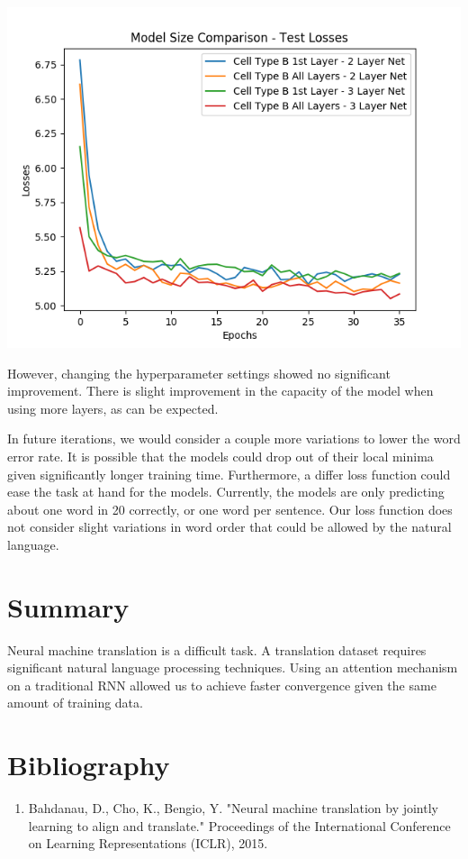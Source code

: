 \documentclass[letterpaper, 10pt]{article}
\begin{document}
\begin{multicols}{2}
\begin{center}
\includegraphics[scale=.4]{size_comparison_losses_test}
\end{center}

\noindent However, changing the hyperparameter settings showed no significant improvement.
There is slight improvement in the capacity of the model when using more layers, as can be expected.

In future iterations, we would consider a couple more variations to lower the word error rate.
It is possible that the models could drop out of their local minima given significantly longer
training time.
Furthermore, a differ loss function could ease the task at hand for the models.
Currently, the models are only predicting about one word in 20 correctly, or one word per sentence.
Our loss function does not consider slight variations in word order that could be allowed by the
natural language.

\section{Summary}
Neural machine translation is a difficult task.
A translation dataset requires significant natural language processing techniques.
Using an attention mechanism on a traditional RNN allowed us to achieve faster convergence given
the same amount of training data.

\section{Bibliography}
\begin{enumerate}
\item Bahdanau, D., Cho, K., Bengio, Y. "Neural machine translation by jointly learning to align and translate." Proceedings of the International Conference on Learning Representations (ICLR), 2015.


\end{enumerate}
\end{multicols}
\end{document}

